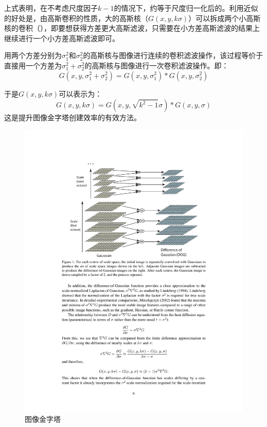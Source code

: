 上式表明，在不考虑尺度因子$k-1$的情况下，\DoG 约等于尺度归一化后的\lpl。利用\DoG 近似的好处是，由高斯卷积的性质，大的高斯核（$G(x,y,k\sigma)$）可以拆成两个小高斯核的卷积（），即要想获得方差更大高斯滤波，只需要在小方差高斯滤波的结果上继续进行一个小方差高斯滤波即可。
\begin{theorem}
	\label{thm: gaussian convolution}
	用两个方差分别为$\sigma^2_1$和$\sigma^2_2$的高斯核与图像进行连续的卷积滤波操作，该过程等价于直接用一个方差为$\sigma^2_1 + \sigma^2_2$的高斯核与图像进行一次卷积滤波操作。即：
	\begin{equation*}
		G(x, y, \sigma^2_1 + \sigma^2_2) = G(x, y, \sigma^2_1) \ast G(x, y, \sigma^2_2)
	\end{equation*}
\end{theorem}

于是$G(x,y,k\sigma)$可以表示为：
\begin{equation}
	G(x,y,k\sigma) = G(x,y,\sqrt{k^2 - 1}\sigma) \ast G(x,y,\sigma)
	\label{equ: gaussian convolution}
\end{equation}
这是提升\DoG 图像金字塔创建效率的有效方法。

\begin{figure}[H]
	\centering
	\includegraphics[width=.9\textwidth]{fig/construction of DoG.pdf}
	\caption{\DoG 图像金字塔}
	\label{fig: DoG Pyramid}
\end{figure}

